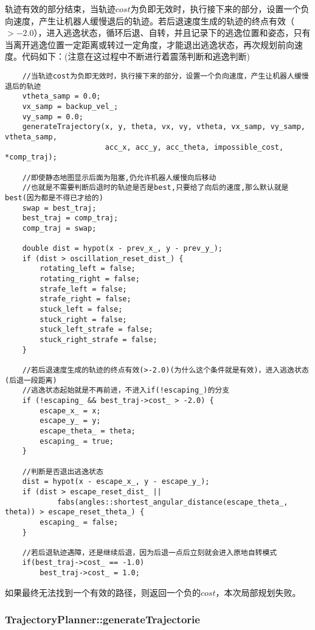 \documentclass[9pt, oneside]{book}
\begin{document}
轨迹有效的部分结束，当轨迹$cost$为负即无效时，执行接下来的部分，设置一个负向速度，产生让机器人缓慢退后的轨迹。若后退速度生成的轨迹的终点有效（$> -2.0$），进入逃逸状态，循环后退、自转，并且记录下的逃逸位置和姿态，只有当离开逃逸位置一定距离或转过一定角度，才能退出逃逸状态，再次规划前向速度。代码如下：(注意在这过程中不断进行着震荡判断和逃逸判断)

\footnotesize
\begin{verbatim}
    //当轨迹cost为负即无效时，执行接下来的部分，设置一个负向速度，产生让机器人缓慢退后的轨迹
    vtheta_samp = 0.0;
    vx_samp = backup_vel_;
    vy_samp = 0.0;
    generateTrajectory(x, y, theta, vx, vy, vtheta, vx_samp, vy_samp, vtheta_samp,
                       acc_x, acc_y, acc_theta, impossible_cost, *comp_traj);

    //即使静态地图显示后面为阻塞,仍允许机器人缓慢向后移动
    //也就是不需要判断后退时的轨迹是否是best,只要给了向后的速度,那么默认就是best(因为都是不得已才给的)
    swap = best_traj;
    best_traj = comp_traj;
    comp_traj = swap;

    double dist = hypot(x - prev_x_, y - prev_y_);
    if (dist > oscillation_reset_dist_) {
        rotating_left = false;
        rotating_right = false;
        strafe_left = false;
        strafe_right = false;
        stuck_left = false;
        stuck_right = false;
        stuck_left_strafe = false;
        stuck_right_strafe = false;
    }

    //若后退速度生成的轨迹的终点有效(>-2.0)(为什么这个条件就是有效)，进入逃逸状态(后退一段距离)
    //逃逸状态起始就是不再前进，不进入if(!escaping_)的分支
    if (!escaping_ && best_traj->cost_ > -2.0) {
        escape_x_ = x;
        escape_y_ = y;
        escape_theta_ = theta;
        escaping_ = true;
    }

    //判断是否退出逃逸状态
    dist = hypot(x - escape_x_, y - escape_y_);
    if (dist > escape_reset_dist_ ||
            fabs(angles::shortest_angular_distance(escape_theta_, theta)) > escape_reset_theta_) {
        escaping_ = false;
    }

    //若后退轨迹遇障，还是继续后退，因为后退一点后立刻就会进入原地自转模式
    if(best_traj->cost_ == -1.0)
        best_traj->cost_ = 1.0;
\end{verbatim}
\normalsize

如果最终无法找到一个有效的路径，则返回一个负的$cost$，本次局部规划失败。

\subsubsection{TrajectoryPlanner::generateTrajectorie}
\end{document}
